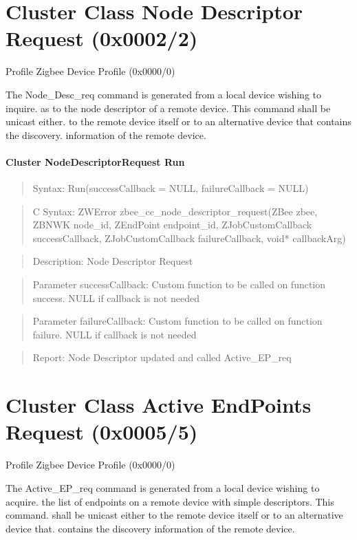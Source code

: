 

\section{Cluster Class Node Descriptor Request (0x0002/2)}

Profile Zigbee Device Profile (0x0000/0)

The Node\_Desc\_req command is generated from a local device wishing to inquire. as to the node descriptor of a remote device. This command shall be unicast either. to the remote device itself or to an alternative device that contains the discovery. information of the remote device.
\paragraph{Cluster NodeDescriptorRequest Run}
\begin{quote}Syntax: Run(successCallback = NULL, failureCallback = NULL)\end{quote}
\begin{quote}C Syntax: ZWError zbee\_cc\_node\_descriptor\_request(ZBee zbee, ZBNWK node\_id, ZEndPoint endpoint\_id, ZJobCustomCallback successCallback, ZJobCustomCallback failureCallback, void* callbackArg)\end{quote}
\begin{quote}Description: Node Descriptor Request\end{quote}
\begin{quote}Parameter successCallback: Custom function to be called on function success. NULL if callback is not needed\end{quote}
\begin{quote}Parameter failureCallback: Custom function to be called on function failure. NULL if callback is not needed\end{quote}
\begin{quote}Report: Node Descriptor updated and called Active\_EP\_req\end{quote}


\section{Cluster Class Active EndPoints Request (0x0005/5)}

Profile Zigbee Device Profile (0x0000/0)

The Active\_EP\_req command is generated from a local device wishing to acquire. the list of endpoints on a remote device with simple descriptors. This command. shall be unicast either to the remote device itself or to an alternative device that. contains the discovery information of the remote device.
